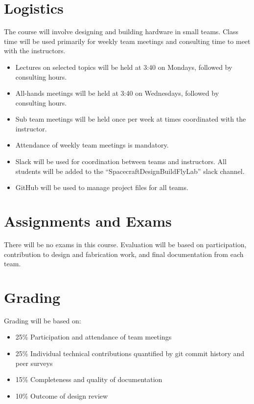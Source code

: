 \documentclass[11pt,letterpaper]{article}
\begin{document}
\section*{Logistics}

The course will involve designing and building hardware in small teams. Class time will be used primarily for weekly team meetings and consulting time to meet with the instructors.

\begin{itemize}
	\item Lectures on selected topics will be held at 3:40 on Mondays, followed by consulting hours.
	\item All-hands meetings will be held at 3:40 on Wednesdays, followed by consulting hours.
	\item Sub team meetings will be held once per week at times coordinated with the instructor.
	\item Attendance of weekly team meetings is mandatory.
	\item Slack will be used for coordination between teams and instructors. All students will be added to the ``SpacecraftDesignBuildFlyLab'' slack channel.
	\item GitHub will be used to manage project files for all teams.
\end{itemize}

\section*{Assignments and Exams}

There will be no exams in this course. Evaluation will be based on participation, contribution to design and fabrication work, and final documentation from each team.

\section*{Grading}

Grading will be based on:
\begin{itemize}
	\item 25\% Participation and attendance of team meetings
	\item 25\% Individual technical contributions quantified by git commit history and peer surveys
	\item 15\% Completeness and quality of documentation
	\item 10\% Outcome of design review
\end{itemize}
\end{document}
